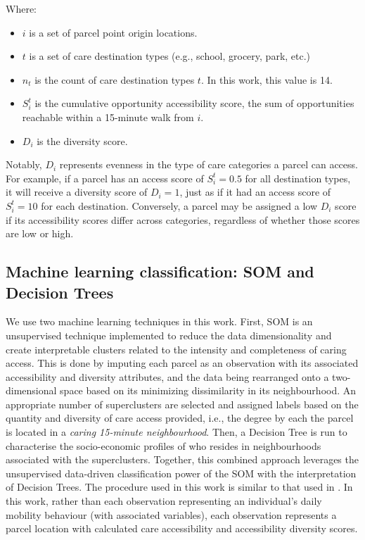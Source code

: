 \documentclass[
  authoryear,
  preprint,
  3p]{elsarticle}
\providecommand{\tightlist}{%
  \setlength{\itemsep}{0pt}\setlength{\parskip}{0pt}}\usepackage{longtable,booktabs,array}
\def\tightlist{}
\begin{document}
\noindent Where:

\begin{itemize}
\tightlist
\item
  \(i\) is a set of parcel point origin locations.
\item
  \(t\) is a set of care destination types (e.g., school, grocery, park,
  etc.)
\item
  \(n_t\) is the count of care destination types \(t\). In this work,
  this value is 14.
\item
  \(S_{i}^t\) is the cumulative opportunity accessibility score, the sum
  of opportunities reachable within a 15-minute walk from \(i\).
\item
  \(D_i\) is the diversity score.
\end{itemize}

Notably, \(D_i\) represents evenness in the type of care categories a
parcel can access. For example, if a parcel has an access score of
\(S_i^t = 0.5\) for all destination types, it will receive a diversity
score of \(D_i = 1\), just as if it had an access score of
\(S_i^t = 10\) for each destination. Conversely, a parcel may be
assigned a low \(D_i\) score if its accessibility scores differ across
categories, regardless of whether those scores are low or high.

\subsection{Machine learning classification: SOM and Decision
Trees}\label{machine-learning-classification-som-and-decision-trees}

We use two machine learning techniques in this work. First, SOM is an
unsupervised technique implemented to reduce the data dimensionality and
create interpretable clusters related to the intensity and completeness
of caring access. This is done by imputing each parcel as an observation
with its associated accessibility and diversity attributes, and the data
being rearranged onto a two-dimensional space based on its minimizing
dissimilarity in its neighbourhood. An appropriate number of
superclusters are selected and assigned labels based on the quantity and
diversity of care access provided, i.e., the degree by each the parcel
is located in a \emph{caring 15-minute neighbourhood}. Then, a Decision
Tree is run to characterise the socio-economic profiles of who resides
in neighbourhoods associated with the superclusters. Together, this
combined approach leverages the unsupervised data-driven classification
power of the SOM with the interpretation of Decision Trees. The
procedure used in this work is similar to that used in
\citet{victorianoTimeSpaceMoney2020}. In this work, rather than each
observation representing an individual's daily mobility behaviour (with
associated variables), each observation represents a parcel location
with calculated care accessibility and accessibility diversity scores.
\end{document}
